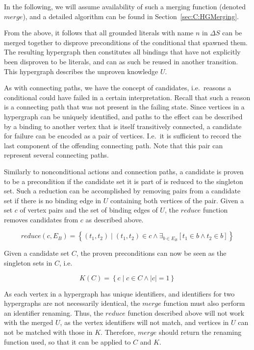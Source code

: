 \documentclass[\master/Master.tex]{subfiles}
\begin{document}
In the following, we will assume availability of such a merging function (denoted $merge$), and a detailed algorithm can be found in Section~\ref{sec:C:HGMerging}.

From the above, it follows that all grounded literals with name $n$ in $\Delta S$ can be merged together to disprove preconditions of the conditional that spawned them. The resulting hypergraph then constitutes all bindings that have not explicitly been disproven to be literals, and can as such be reused in another transition. This hypergraph describes the unproven knowledge $U$.

As with connecting paths, we have the concept of candidates, i.e.\ reasons a conditional could have failed in a certain interpretation. Recall that such a reason is a connecting path that was not present in the failing state. Since vertices in a hypergraph can be uniquely identified, and paths to the effect can be described by a binding to another vertex that is itself transitively connected, a candidate for failure can be encoded as a pair of vertices. I.e.\ it is sufficient to record the last component of the offending connecting path. Note that this pair can represent several connecting paths.

Similarly to nonconditional actions and connection paths, a candidate is proven to be a precondition if the candidate set it is part of is reduced to the singleton set. Such a reduction can be accomplished by removing pairs from a candidate set if there is no binding edge in $U$ containing both vertices of the pair. Given a set $c$ of vertex pairs and the set of binding edges of $U$, the $reduce$ function removes candidates from $c$ as described above.

\begin{equation*}
    reduce(c, E_B) =
    \left\{ \left( t_1, t_2 \right) \mid 
        \left( t_1, t_2 \right) \in c \land 
        \exists_{b \in E_B} \left[ t_1 \in b \land t_2 \in b \right] 
    \right\}
\end{equation*}

Given a candidate set $C$, the proven preconditions can now be seen as the singleton sets in $C$, i.e.\ 

\begin{equation*}
    K(C) = \left\{ 
        c \mid c \in C \land |c| = 1
    \right\}
\end{equation*}

As each vertex in a hypergraph has unique identifiers, and identifiers for two hypergraphs are not necessarily identical, the $merge$ function must also perform an identifier renaming. Thus, the $reduce$ function described above will not work with the merged $U$, as the vertex identifiers will not match, and vertices in $U$ can not be matched with those in $K$. Therefore, $merge$ should return the renaming function used, so that it can be applied to $C$ and $K$.
\end{document}
